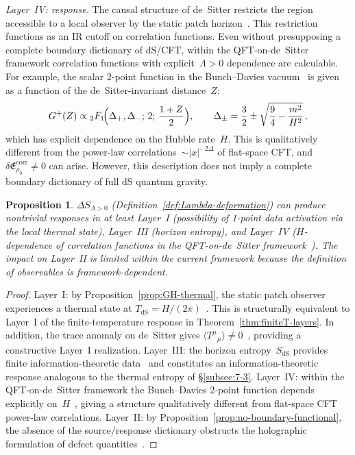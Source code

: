 \documentclass[
  aps,
  prd,
  preprint,
  groupedaddress,
  nofootinbib,
  longbibliography
]{revtex4-2}
\newtheorem{proposition}[definition]{Proposition}
\theoremstyle{remark}
\newcommand{\dS}{\mathrm{dS}}
\begin{document}
\emph{Layer~IV: response.}
The causal structure of de~Sitter restricts the region
accessible to a local observer by the static patch
horizon~\cite{ref17,ref20,ref21}.
This restriction functions as an IR cutoff on correlation
functions.
Even without presupposing a complete boundary dictionary of
dS/CFT, within the QFT-on-de~Sitter framework correlation
functions with explicit~$\Lambda>0$ dependence are calculable.
For example, the scalar 2-point function in the Bunch--Davies
vacuum~\cite{ref22,ref23} is given as a function of the
de~Sitter-invariant distance~$Z$:
\begin{equation}\label{eq:dS-2pt}
  G^+(Z) \propto
  {}_2F_1\!\Bigl(\Delta_+,\Delta_-;\,2;\,
    \frac{1+Z}{2}\Bigr),
  \qquad
  \Delta_\pm = \frac{3}{2}\pm
    \sqrt{\frac{9}{4}-\frac{m^2}{H^2}}\,,
\end{equation}
which has explicit dependence on the Hubble rate~$H$.
This is qualitatively different from the power-law
correlations~$\sim|x|^{-2\Delta}$ of flat-space CFT, and
$\delta\mathfrak{E}_{\rho_0}^{\mathrm{corr}}\neq 0$
can arise.
However, this description does not imply a complete boundary
dictionary of full dS quantum gravity.

\begin{proposition}\label{prop:Lambda-layers}
$\Delta S_{\Lambda>0}$ (Definition~\ref{def:Lambda-deformation})
can produce nontrivial responses in at least Layer~I (possibility
of 1-point data activation via the local thermal state),
Layer~III (horizon entropy), and Layer~IV ($H$-dependence of
correlation functions in the QFT-on-de~Sitter
framework~\cite{ref22,ref23}).
The impact on Layer~II is limited within the current framework
because the definition of observables is framework-dependent.
\end{proposition}

\begin{proof}
Layer~I: by Proposition~\ref{prop:GH-thermal}, the static patch
observer experiences a thermal state at
$T_{\dS}=H/(2\pi)$~\cite{ref15}.
This is structurally equivalent to Layer~I of the
finite-temperature response in
Theorem~\ref{thm:finiteT-layers}.
In addition, the trace anomaly on de~Sitter gives
$\langle T^\mu{}_\mu\rangle\neq 0$~\cite{ref23},
providing a constructive Layer~I realization.
Layer~III: the horizon entropy~$S_{\dS}$ provides finite
information-theoretic data~\cite{ref15} and constitutes an
information-theoretic response analogous to the thermal entropy
of \S\ref{subsec:7-3}.
Layer~IV: within the QFT-on-de~Sitter framework the
Bunch--Davies 2-point function depends explicitly
on~$H$~\cite{ref22,ref23}, giving a structure qualitatively
different from flat-space CFT power-law correlations.
Layer~II: by Proposition~\ref{prop:no-boundary-functional},
the absence of the source/response dictionary obstructs the
holographic formulation of defect
quantities~\cite{ref16,ref17,ref18,ref19,ref20,ref21}.
\end{proof}
\end{document}
